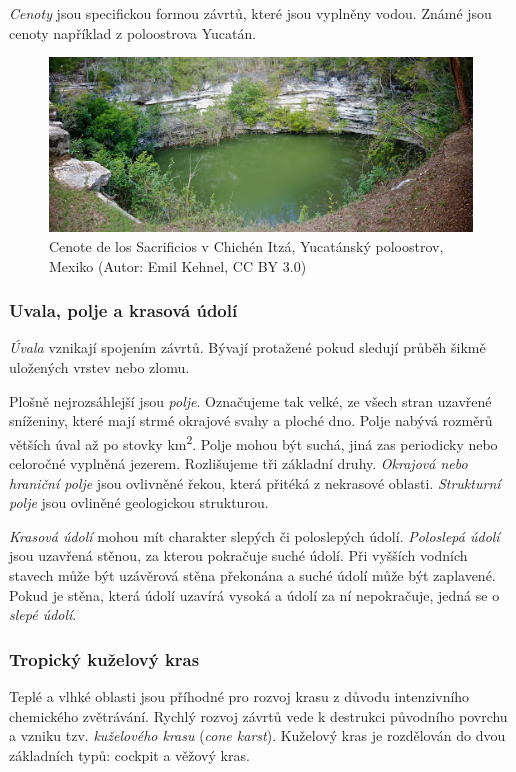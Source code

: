 \emph{Cenoty} jsou specifickou formou závrtů, které jsou vyplněny vodou. Známé jsou cenoty například z poloostrova Yucatán.

\begin{figure}[h]
	\centering
	\includegraphics[width=1\linewidth]{obrazky/karst/Mexico_Cenotes}
	\caption{Cenote de los Sacrificios v Chichén Itzá, Yucatánský poloostrov, Mexiko (Autor: Emil Kehnel, CC BY 3.0)}
\end{figure}

\subsubsection{Uvala, polje a krasová údolí}
\emph{Úvala} vznikají spojením závrtů. Bývají protažené pokud sledují průběh šikmě uložených vrstev nebo zlomu. 

Plošně nejrozsáhlejší jsou \emph{polje}. Označujeme tak velké, ze všech stran uzavřené sníženiny, které mají strmé okrajové svahy a ploché dno. Polje nabývá rozměrů větších úval až po stovky \si{\kilo\metre\squared}. Polje mohou být suchá, jiná zas periodicky nebo celoročné vyplněná jezerem. Rozlišujeme tři základní druhy. \emph{Okrajová nebo hraniční polje} jsou ovlivněné řekou, která přitéká z nekrasové oblasti. \emph{Strukturní polje} jsou ovliněné geologickou strukturou.   

\emph{Krasová údolí} mohou mít charakter slepých či poloslepých údolí. \emph{Poloslepá údolí} jsou uzavřená stěnou, za kterou pokračuje suché údolí. Při vyšších vodních stavech může být uzávěrová stěna překonána a suché údolí může být zaplavené. Pokud je stěna, která údolí uzavírá vysoká a údolí za ní nepokračuje, jedná se o \emph{slepé údolí}.

\subsubsection{Tropický kuželový kras}
Teplé a vlhké oblasti jsou příhodné pro rozvoj krasu z důvodu intenzivního chemického zvětrávání. Rychlý rozvoj závrtů vede k destrukci původního povrchu a vzniku tzv. \emph{kuželového krasu} (\textit{cone karst}). Kuželový kras je rozdělován do dvou základních typů: cockpit a věžový kras.

